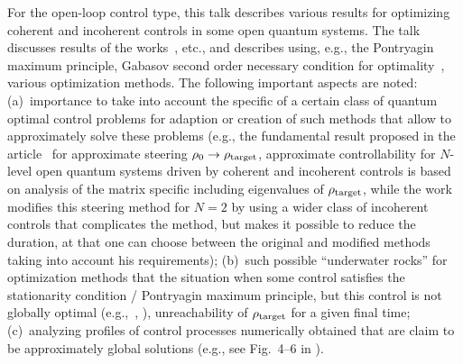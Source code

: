 \documentclass[12pt]{llncs}
\begin{document}
For the open-loop control type, this talk describes various results for optimizing
coherent and  incoherent controls in some open quantum systems. The talk discusses results of the works~\cite{ccMorzhinLJM2019,ccMorzhinPhysPartNucl2020,ccMorzhinProcSteklov2021,ccMorzhin_arXiv2022}, etc., and describes using, e.g., 
the Pontryagin maximum principle, Gabasov second order necessary condition for 
optimality~\cite{ccMorzhinPhysPartNucl2020},
various optimization methods. The following important aspects are noted:
(a)~importance to take into account the specific of a certain class of quantum optimal control problems
for adaption or creation of such methods that allow to approximately solve these problems
(e.g., the fundamental result proposed in the article~\cite{ccPechenPRA2011}
for approximate steering $\rho_0 \to \rho_{\rm target}$, 
approximate controllability for $N$-level open quantum systems driven by coherent and incoherent controls  
is based on analysis of the matrix specific including eigenvalues of $\rho_{\rm target}$, while
the work~\cite[Sec.~4]{ccMorzhin_arXiv2022} modifies this steering method for $N=2$
by using a wider class of incoherent controls that 
complicates the method, but makes it possible to reduce the duration, 
at that one can choose between the original and modified methods taking into account his requirements); 
(b)~such possible ``underwater rocks'' for optimization methods that the situation when some control satisfies 
the stationarity condition / Pontryagin maximum principle, but this control is not globally 
optimal (e.g.,~\cite[Sec.~7]{ccMorzhinProcSteklov2021}, \cite[Sec.~3]{ccMorzhin_arXiv2022}), unreachability of $\rho_{\rm target}$ for a given final time;
(c)~analyzing profiles of control processes numerically obtained that are claim to be approximately 
global solutions (e.g., see Fig.~4--6 in \cite{ccMorzhinLJM2019}).
\end{document}

